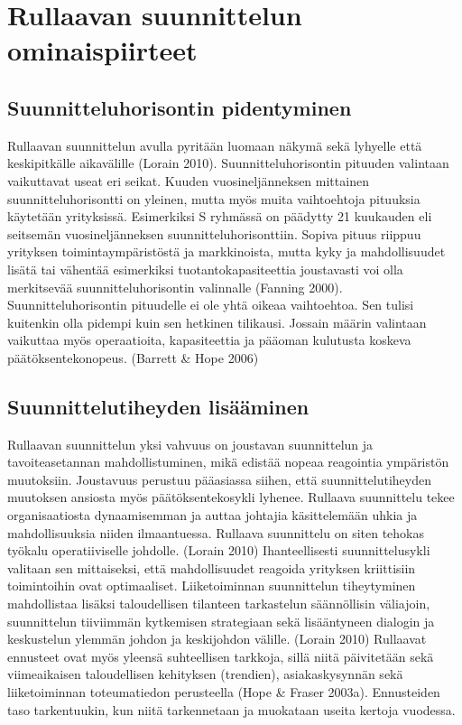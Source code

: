 \documentclass[12pt,a4paper,oneside,pdftex]{report}
\begin{document}
\section{Rullaavan suunnittelun ominaispiirteet}

\subsection{Suunnitteluhorisontin pidentyminen}

Rullaavan suunnittelun avulla pyritään luomaan näkymä sekä lyhyelle että keskipitkälle aikavälille (Lorain 2010). Suunnitteluhorisontin pituuden valintaan vaikuttavat useat eri seikat. Kuuden vuosineljänneksen mittainen suunnitteluhorisontti on yleinen, mutta myös muita vaihtoehtoja pituuksia käytetään yrityksissä. Esimerkiksi S ryhmässä on päädytty 21 kuukauden eli seitsemän vuosineljänneksen suunnitteluhorisonttiin. Sopiva pituus riippuu yrityksen toimintaympäristöstä ja markkinoista, mutta kyky ja mahdollisuudet lisätä tai vähentää esimerkiksi tuotantokapasiteettia joustavasti voi olla merkitsevää suunnitteluhorisontin valinnalle (Fanning 2000). Suunnitteluhorisontin pituudelle ei ole yhtä oikeaa vaihtoehtoa. Sen tulisi kuitenkin olla pidempi kuin sen hetkinen tilikausi. Jossain määrin valintaan vaikuttaa myös operaatioita, kapasiteettia ja pääoman kulutusta koskeva päätöksentekonopeus. (Barrett & Hope 2006)

\subsection{Suunnittelutiheyden lisääminen}

Rullaavan suunnittelun yksi vahvuus on joustavan suunnittelun ja tavoiteasetannan mahdollistuminen, mikä edistää nopeaa reagointia ympäristön muutoksiin. Joustavuus perustuu pääasiassa siihen, että suunnittelutiheyden muutoksen ansiosta myös päätöksentekosykli lyhenee. Rullaava suunnittelu tekee organisaatiosta dynaamisemman ja auttaa johtajia käsittelemään uhkia ja mahdollisuuksia niiden ilmaantuessa. Rullaava suunnittelu on siten tehokas työkalu operatiiviselle johdolle. (Lorain 2010) Ihanteellisesti suunnittelusykli valitaan sen mittaiseksi, että mahdollisuudet reagoida yrityksen kriittisiin toimintoihin ovat optimaaliset. Liiketoiminnan suunnittelun tiheytyminen mahdollistaa lisäksi taloudellisen tilanteen tarkastelun säännöllisin väliajoin, suunnittelun tiiviimmän kytkemisen strategiaan sekä lisääntyneen dialogin ja keskustelun ylemmän johdon ja keskijohdon välille. (Lorain 2010) Rullaavat ennusteet ovat myös yleensä suhteellisen tarkkoja, sillä niitä päivitetään sekä viimeaikaisen taloudellisen kehityksen (trendien), asiakaskysynnän sekä liiketoiminnan toteumatiedon perusteella (Hope & Fraser 2003a). Ennusteiden taso tarkentuukin, kun niitä tarkennetaan ja muokataan useita kertoja vuodessa.
\end{document}
